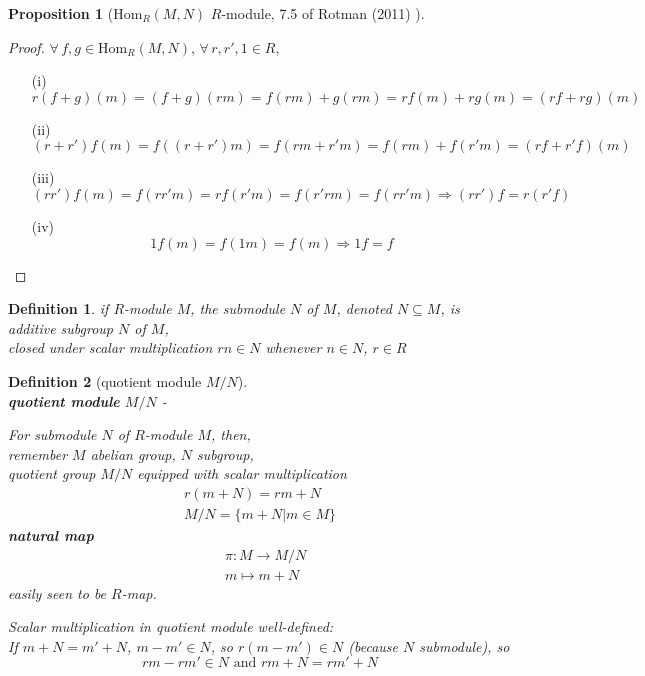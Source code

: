 \documentclass[10pt]{amsart}
\newtheorem{proposition}{Proposition}
\newtheorem{definition}{Definition}
\begin{document}
\begin{multicols*}{2}
\begin{proposition}[$\text{Hom}_R(M,N)$ $R$-module, 7.5 of Rotman (2011)  \cite{JRotman2010}]
	
	
\end{proposition}

\begin{proof}
	$\forall \, f,g \in \text{Hom}_R(M,N)$, $\forall \, r,r', 1 \in R$, 
	\begin{enumerate}
		\item[(i)] 
		\[
		r(f+g)(m) = (f+g)(rm) = f(rm) + g(rm) = rf(m) + rg(m) = (rf+rg)(m) 
		\]
		\item[(ii)]
		\[
		(r+r')f(m) = f((r+r')m) = f(rm+r'm) = f(rm) + f(r'm) = (rf+ r'f)(m)
		\]
		\item[(iii)]
		\[
		(rr')f(m) = f(rr'm) = rf(r'm) = f(r'rm) = f(rr'm) \Longrightarrow (rr')f = r(r'f)
		\]
		\item[(iv)]
		\[
		1f(m) = f(1m) = f(m) \Longrightarrow 1f =f
		\]
	\end{enumerate}
	\end{proof}



\begin{definition}
	if $R$-module $M$, the submodule $N$ of $M$, denoted $N\subseteq M$, is additive subgroup $N$ of $M$, \\
	closed under scalar multiplication $rn \in N$ whenever $n\in N$, $r\in R$
\end{definition}




\begin{definition}[quotient module $M/N$] \qquad \, \\ 
\textbf{quotient module} $M/N$  -

For submodule $N$ of $R$-module $M$, then, \\
remember $M$ abelian group, $N$ subgroup, \\
quotient group $M/N$ equipped with scalar multiplication 
\[
\begin{gathered}
	r(m+N) = rm+N \\ 
M/N = \lbrace m +N | m \in M \rbrace
\end{gathered}
\]
\textbf{natural map} 
\begin{equation}
\begin{aligned}
& \pi : M \to M /N \\ 
& m\mapsto m + N 
\end{aligned}
\end{equation}
easily seen to be $R$-map.  

Scalar multiplication in quotient module well-defined: \\
If $m+N=m'+N$, $m-m' \in N$, so $r(m-m') \in N$ (because $N$ submodule), so 
\[
rm - rm' \in N \text{ and } rm+ N = rm' +N
\]



\end{definition}
\end{multicols*}
\end{document}
